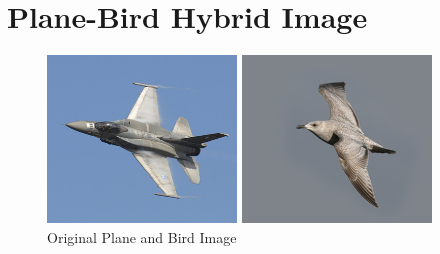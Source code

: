 \documentclass[12pt]{report}
\begin{document}
\section{Plane-Bird Hybrid Image}
\vspace{1.25em}
\begin{figure}[H]
    \centering
    \begin{minipage}{0.45\textwidth}
            \centering
            \includegraphics[height=12em]{./images/plane.jpg}
        \end{minipage}
        \begin{minipage}{0.45\textwidth}
            \centering
            \includegraphics[height=12em]{./images/bird.jpg}
        \end{minipage}
        \caption{Original Plane and Bird Image}
        \label{plane_bird}
\end{figure}
\end{document}
